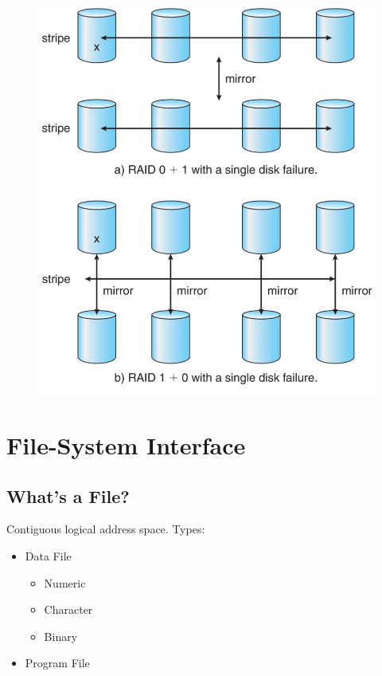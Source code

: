 \begin{figure}[h!]
\begin{minipage}[h!]{0.5\textwidth}
    \centering
    \includegraphics[width=1\linewidth]{img/zmnfdg.png}    
    \end{minipage}
\end{figure}


\chapter{File-System Interface}

\section{What’s a File?}

Contiguous logical address space. Types:

\begin{itemize}
    \item Data File
        \begin{itemize}
        \item Numeric
        \item Character
        \item Binary
        \end{itemize}
    \item Program File
\end{itemize}

